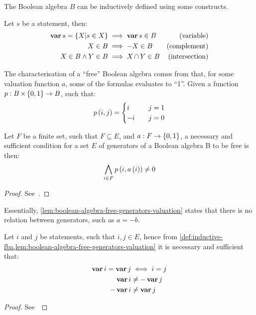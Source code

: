 \documentclass[en,twoside,onehalfspacing,phd]{risethesis}
\def\varop{\ensuremath\operatorname{\mathbf{var}}}
\newcommand{\var}[1]{\ensuremath\varop #1}
\newcommand{\setsin}[1]{\ensuremath\left\{ #1 \right\}}
\newcommand{\parsin}[1]{\ensuremath\left( #1 \right)}
\def\inter{\ensuremath\operatorname{\cap}}
\def\cartesian{\ensuremath\operatorname{\times}}
\begin{document}
The Boolean algebra $B$ can be inductively defined using some constructs.
%
\begin{Def}
\label{def:inductive-fba}
Let $s$ be a statement, then:
%
\begin{subequations}
\begin{align}
\var s = \setsin{X | s \in X} & \implies \var s \in B & \text{(variable)}\\
X \in B & \implies -X \in B                           & \text{(complement)}\\
X \in B \land Y \in B & \implies X \inter Y \in B     & \text{(intersection)}
\end{align}
\end{subequations}
%
\end{Def}

The characterisation of a ``free'' Boolean algebra comes from that, for some valuation function $a$, some of the formulas evaluates to ``1''.
Given a function $p:B \cartesian \setsin{0,1} \rightarrow B$, such that:
%
\begin{equation}
p\parsin{i,j} =
\begin{cases}
  i & \quad j = 1\\
  -i & \quad j = 0
\end{cases}
\end{equation}

\begin{Lem}
\label{lem:boolean-algebra-free-generators-valuation}
Let $F$ be a finite set, such that $F \subseteq E$, and $a: F \rightarrow \setsin{0,1}$, a necessary and sufficient condition for a set $E$ of generators of a Boolean algebra B to be free is then:
%
\begin{equation}
\bigwedge_{i \in F} p\parsin{i, a \parsin{i}} \neq 0
\end{equation}
\end{Lem}
\begin{proof}
See~\cite[p. 258]{GH2009}.
\end{proof}


Essentially, \cref{lem:boolean-algebra-free-generators-valuation} states that there is no relation between generators, such as $a = -b$.

\begin{Lem}
Let $i$ and $j$ be statements, such that $i,j \in E$, hence from \cref{def:inductive-fba,lem:boolean-algebra-free-generators-valuation} it is necessary and sufficient that:
%
\begin{subequations}
\begin{align}
\var i = \var j & \iff i = j\\
\var i & \neq - \var j\\
-\var i & \neq \var j
\end{align}
\end{subequations}
%
\end{Lem}
%
\begin{proof}
See~\cite[p. 4]{Huffm2010}
\end{proof}
\end{document}

